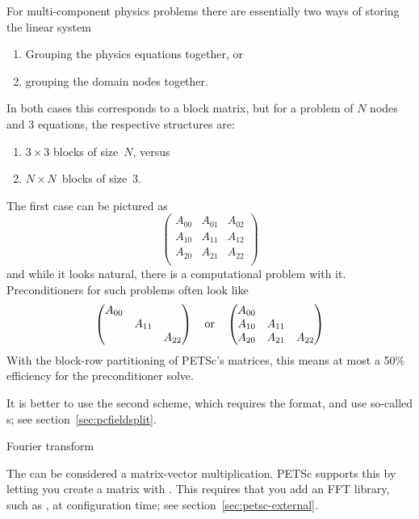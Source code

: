 For multi-component physics problems there are essentially
two ways of storing the linear system
\begin{enumerate}
\item Grouping the physics equations together, or
\item grouping the domain nodes together.
\end{enumerate}
In both cases this corresponds to a block matrix, but
for a problem of $N$ nodes and $3$ equations, the
respective structures are:
\begin{enumerate}
\item $3\times 3 $ blocks of size~$N$, versus
\item $N\times N$~blocks of size~$3$.
\end{enumerate}
The first case can be pictured as
\[ 
\begin{pmatrix}
  A_{00}&A_{01}&A_{02}\\ A_{10}&A_{11}&A_{12}\\ A_{20}&A_{21}&A_{22}\\ 
\end{pmatrix}
\]
and while it looks natural, there is a computational problem with it.
Preconditioners for such problems often look like
\[ 
\begin{pmatrix}
  A_{00}&\\ &A_{11}&\\ &&A_{22}\\ 
\end{pmatrix}
\quad\hbox{or}\quad
\begin{pmatrix}
  A_{00}&&\\ A_{10}&A_{11}&\\ A_{20}&A_{21}&A_{22}\\ 
\end{pmatrix}
\]
With the block-row partitioning of PETSc's matrices, this means
at most a 50\% efficiency for the preconditioner solve.

It is better to use the second scheme, which requires the
 format,
and use so-called s;
see section~\ref{sec:pcfieldsplit}.

 {Fourier transform}
\label{sec:petscfft}

The  can be considered a matrix-vector multiplication.
PETSc supports this by letting you create a matrix with .
This requires that you add an FFT library, such as ,
at configuration time; see section~\ref{sec:petsc-external}.


